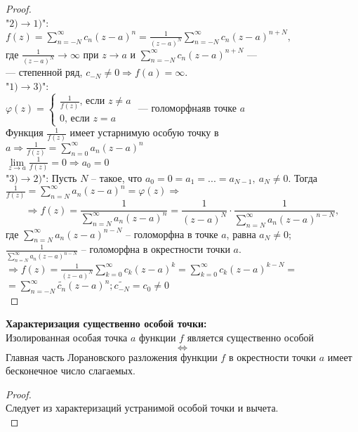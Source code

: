\begin{proof}
    \ \\
    "$2) \to 1)$":\\
    $f(z)=\sum_{n=-N}^\infty c_n(z-a)^n=\frac{1}{(z-a)^N}\sum_{n=-N}^\infty c_n (z-a)^{n+N},$\\
    где $\frac{1}{(z-a)^N}\to \infty$ при $z\to a$ и $\sum_{n=-N}^\infty c_n (z-a)^{n+N}$ ---\\ 
    --- степенной ряд, $c_{-N} \neq 0 \Rightarrow f(a) = \infty$.\\[2mm]
    "$1) \to 3)$":\\
    $\varphi(z)=
    \begin{cases}
        \frac{1}{f(z)}\text{, если }z\neq a\\
        0\text{, если }z=a
    \end{cases}
    \text{ --- голоморфнаяв точке }a$\\
    Функция $\frac{1}{f(z)}$ имеет устарнимую особую точку в $a \Rightarrow \frac{1}{f(z)}=\sum_{n=0}^\infty a_n(z-a)^n$\\
    $\lim\limits_{z\to a}\frac{1}{f(z)}=0\Rightarrow a_0 =0$\\[2mm]
    "$3) \to 2)$":
    Пусть $N$ -- такое, что $a_0 = 0 = a_1=...=a_{N-1}, \ a_N \neq 0$.   Тогда $\frac{1}{f(z)}=\sum_{n=N}^\infty a_n(z-a)^n=\varphi(z) \Rightarrow $
    $$\Rightarrow f(z)=\frac{1}{\sum_{n=N}^\infty a_n(z-a)^n}=\frac{1}{(z-a)^N}\cdot \frac{1}{\sum_{n=N}^\infty a_n (z-a)^{n-N}},$$
    где $\sum_{n=N}^\infty a_n (z-a)^{n-N}$ -- голоморфна в точке $a$, равна $a_N \neq 0$;\\
    $\frac{1}{\sum_{n=N}^\infty a_n (z-a)^{n-N}}$ -- голоморфна в окрестности точки $a$.\\
    $\Rightarrow f(z)=\frac{1}{(z-a)^N}\sum_{k=0}^\infty c_k (z-a)^k = \sum_{k=0}^\infty c_k (z-a)^{k-N}=$\\
    $=\sum_{n=-N}^\infty \tilde{c_n}(z-a)^n; \tilde{c_{-N}}=c_0\neq 0$\\[2mm]
\end{proof}

\textbf{Характеризация существенно особой точки:}\\
Изолированная особая точка $a$ функции $f$ является существенно особой
$$\Leftrightarrow$$
Главная часть Лорановского разложения функции $f$ в окрестности точки $a$ имеет бесконечное число слагаемых.\\
\begin{proof}
    \ \\
    Следует из характеризаций устранимой особой точки и вычета.\\[2mm]
\end{proof}


